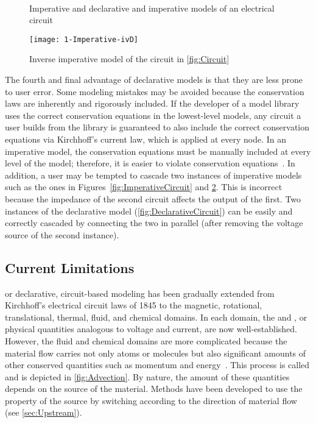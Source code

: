 \begin{figure}[htbp]
  \\
  \caption[Imperative and declarative models of an electrical circuit]{Imperative and declarative and imperative models of an electrical circuit~\cite{ModelicaTutorial1.4}}%
  \label{fig:Circuit}%
\end{figure}

\begin{figure}[htbp]
  \texttt{[image: 1-Imperative-ivD]}%
  \caption{Inverse imperative model of the circuit in \autoref{fig:Circuit}}%
  \label{fig:ImperativeCircuitInverse}%
\end{figure}

The fourth and final advantage of declarative models is that they are less prone to user error.  Some modeling mistakes may be avoided because the conservation laws are inherently and rigorously included.  If the developer of a model library uses the correct conservation equations in the lowest-level models, any circuit a user builds from the library is guaranteed to also include the correct conservation equations via Kirchhoff's current law, which is applied at every node.  In an imperative model, the conservation equations must be manually included at every level of the model; therefore, it is easier to violate conservation equations~\cite{Matei2012}.  In addition, a user may be tempted to cascade two instances of imperative models such as the ones in Figures~\ref{fig:ImperativeCircuit} and \ref{fig:ImperativeCircuitInverse}.  This is incorrect because the impedance of the second circuit affects the output of the first.  Two instances of the declarative model (\autoref{fig:DeclarativeCircuit}) can be easily and correctly cascaded by connecting the two in parallel (after removing the voltage source of the second instance).


\subsection{Current Limitations}
\label{sec:DeclarativeLimitations}

 or declarative, circuit-based modeling has been gradually extended from Kirchhoff's electrical circuit laws of 1845 to the magnetic, rotational, translational, thermal, fluid, and chemical domains.  In each domain, the \emph{} and \emph{}, or physical quantities analogous to voltage and current, are now well-established.  However, the fluid and chemical domains are more complicated because the material flow carries not only atoms or molecules but also significant amounts of other conserved quantities such as momentum and energy~\cite{Cellier2009}.  This process is called \emph{} and is depicted in \autoref{fig:Advection}.  By nature, the amount of these quantities depends on the source of the material.  Methods have been developed to use the property of the source by switching according to the direction of material flow (see \autoref{sec:Upstream}).

